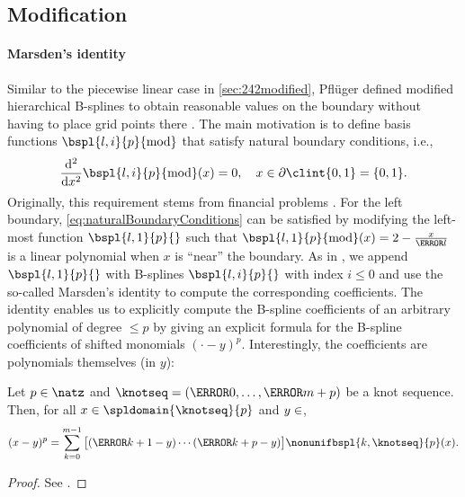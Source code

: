 \subsection{Modification}
\label{sec:313modification}

\paragraph{Marsden's identity}

Similar to the piecewise linear case in \cref{sec:242modified},
Pflüger defined modified
hierarchical B-splines to obtain reasonable values on the boundary
without having to place grid points there \cite{Pflueger10Spatially}.
The main motivation is to define basis
functions $\bspl{l,i}{p}{\modified}$ that satisfy natural boundary
conditions, i.e.,
\begin{equation}
  \label{eq:naturalBoundaryConditions}
  \frac{\diff^2}{\dx^2} \bspl{l,i}{p}{\modified}(x) = 0,\quad
  x \in \bndrydomain{\clint{0, 1}} = \{0, 1\}.
\end{equation}
Originally, this requirement stems from financial problems
\cite{Pflueger10Spatially}.
For the left boundary,
\eqref{eq:naturalBoundaryConditions} can be satisfied by
modifying the left-most function $\bspl{l,1}{p}{}$ such that
$\bspl{l,1}{p}{\modified}(x) = 2 - \tfrac{x}{\ms{l}}$ is a linear polynomial
when $x$ is ``near'' the boundary.
As in \cite{Pflueger10Spatially},
we append $\bspl{l,1}{p}{}$ with
B-splines $\bspl{l,i}{p}{}$ with index $i \le 0$ and
use the so-called Marsden's identity to compute the corresponding
coefficients.
The identity enables us to explicitly compute the B-spline coefficients
of an arbitrary polynomial of degree $\le p$ by giving an explicit formula
for the B-spline coefficients of shifted monomials $({\cdot} - y)^p$.
Interestingly, the coefficients are polynomials themselves (in $y$):

\begin{lemma}
  \label{lemma:marsden}
  Let $p \in \natz$ and
  $\knotseq = (\knot{0}, \dotsc, \knot{m+p})$ be a knot sequence.
  Then, for all $x \in \spldomain{\knotseq}{p}$ and $y \in \real$,
  \begin{equation}
    \label{eq:marsden}
    (x - y)^p
    = \sum_{k=0}^{m-1} \big[(\knot{k+1} - y) \dotsm (\knot{k+p} - y)\big]
    \nonunifbspl{k,\knotseq}{p}(x).
  \end{equation}
\end{lemma}

\begin{proof}
  See \cite{Hoellig13Approximation}.
\end{proof}

